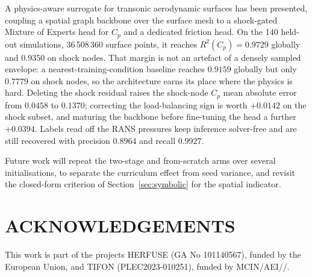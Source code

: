\documentclass{WCCM-ECCOMAS_2026_Full_Paper}
\begin{document}
A physics-aware surrogate for transonic aerodynamic surfaces has been
presented, coupling a spatial graph backbone over the surface mesh to a
shock-gated Mixture of Experts head for $C_p$ and a dedicated friction
head.  On the 140 held-out simulations, 36\,508\,360 surface points, it
reaches $R^{2}(C_p)=0.9729$ globally and $0.9350$ on shock nodes.  That
margin is not an artefact of a densely sampled envelope: a
nearest-training-condition baseline reaches $0.9159$ globally but only
$0.7779$ on shock nodes, so the architecture earns its place where the
physics is hard.  Deleting the shock residual raises the shock-node
$C_p$ mean absolute error from $0.0458$ to $0.1370$; correcting the
load-balancing sign is worth $+0.0142$ on the shock subset, and
maturing the backbone before fine-tuning the head a further $+0.0394$.
Labels read off the RANS pressures keep inference solver-free and are
still recovered with precision $0.8964$ and recall $0.9927$.

Future work will repeat the two-stage and from-scratch arms over several
initialisations, to separate the curriculum effect from seed variance,
and revisit the closed-form criterion of Section~\ref{sec:symbolic} for
the spatial indicator.



\section*{ACKNOWLEDGEMENTS}

This work is part of the projects HERFUSE (GA No 101140567), funded by the
European Union, and TIFON (PLEC2023-010251), funded by
MCIN/AEI//.

\end{document}
